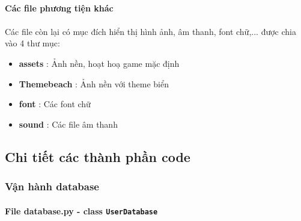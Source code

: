 \paragraph{Các file phương tiện khác}
\paragraph{}{Các file còn lại có mục đích hiển thị hình ảnh, âm thanh, font chữ,... được chia vào 4 thư mục:}

\begin{itemize}
    \item \textbf{assets} : Ảnh nền, hoạt hoạ game mặc định
    \item \textbf{Themebeach} : Ảnh nền với theme biển
    \item \textbf{font} : Các font chữ
    \item \textbf{sound} : Các file âm thanh
\end{itemize}
    

\subsection{Chi tiết các thành phần code}

\subsubsection{Vận hành database}

\paragraph{File database.py - class \texttt{UserDatabase}}

